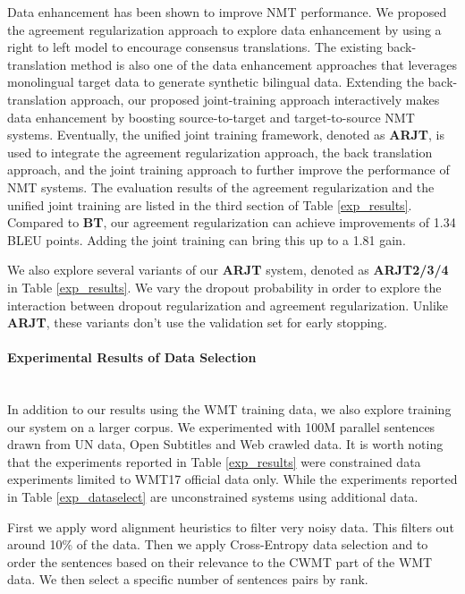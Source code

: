 \documentclass[a4paper]{article}
\begin{document}
\begin{CJK*}{UTF8}{gbsn}
Data enhancement has been shown to improve NMT performance. We proposed the agreement regularization approach to explore data enhancement by using a right to left model to encourage consensus translations. The existing back-translation method is also one of the data enhancement approaches that leverages monolingual target data to generate synthetic bilingual data. Extending the back-translation approach, our proposed joint-training approach interactively makes data enhancement by boosting source-to-target and target-to-source NMT systems. Eventually, the unified joint training framework, denoted as \textbf{ARJT}, is used to integrate the agreement regularization approach, the back translation approach, and the joint training approach to further improve the performance of NMT systems.
The evaluation results of the agreement regularization and the unified joint training are listed in the third section of Table \ref{exp_results}. Compared to \textbf{BT}, our agreement regularization can achieve improvements of 1.34  BLEU points. Adding the joint training can bring this up to a 1.81 gain. 

We also explore several variants of our \textbf{ARJT}  system, denoted as \textbf{ARJT2/3/4} in Table \ref{exp_results}. We vary the dropout probability in order to explore the interaction between dropout regularization and agreement regularization. Unlike \textbf{ARJT}, these variants don't use the validation set for early stopping. 

\paragraph{Experimental Results of Data Selection}\mbox{}\\

In addition to our results using the WMT training data, we also explore training our system on a larger corpus. We experimented with  100M parallel sentences drawn from UN data, Open Subtitles and Web crawled data. 
It is worth noting that the  experiments reported  in Table \ref{exp_results}  were constrained data experiments limited to WMT17 official data only. While the experiments reported in Table \ref{exp_dataselect} are unconstrained systems using additional data.

First we apply word alignment heuristics to filter very noisy data.  This filters out around 10\%  of the data. Then we apply Cross-Entropy data selection \cite{Moorelewis} and \cite{Axelrod} to order the sentences based on their relevance to the CWMT part of the WMT data. We then select a specific number of sentences pairs by rank. 


\end{CJK*}
\end{document}
